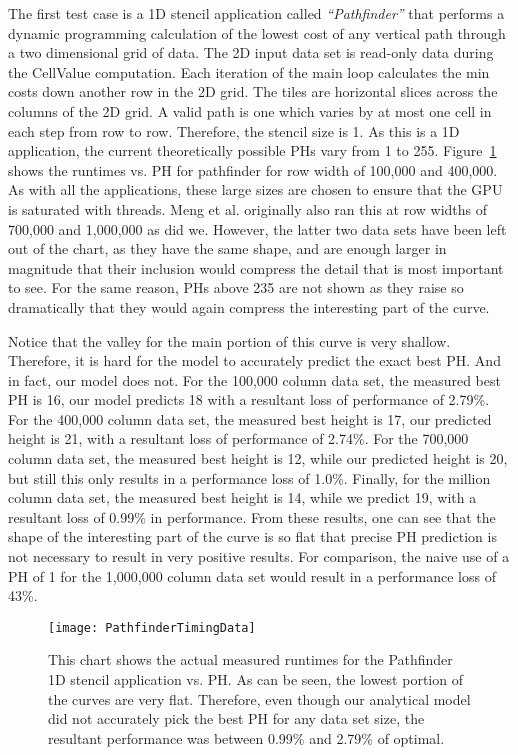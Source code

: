 \documentclass{styles/sig-alternate}
\begin{document}
The first test case is a 1D stencil application called {\em ``Pathfinder''} that performs a dynamic programming calculation 
of the lowest cost of any vertical path through a two dimensional grid of data.  
The 2D input data set is read-only data during the CellValue computation.  
Each iteration of the main loop calculates the min costs down another row in the 2D grid.
The tiles are horizontal slices across the columns of the 2D grid.  A valid path is one which varies by at most one cell 
in each step from row to row.  Therefore, the stencil size is 1.  As this is a 1D application,
the current theoretically possible PHs vary from 1 to 255.  
Figure~\ref{fig:pathfinderTimes} shows the runtimes vs. PH for pathfinder for
row width of 100,000 and 400,000.  As with all the applications, these large sizes are chosen to ensure
that the GPU is saturated with threads.  Meng et al. originally also ran this at row widths of 700,000 and 1,000,000 as did we.
However, the latter two data sets have been left out of the chart, as they have the same shape, and are enough
larger in magnitude that their inclusion would compress the detail that is most important to see.  For the same
reason, PHs above 235 are not shown as they raise so dramatically that they would again compress
the interesting part of the curve.  


Notice that the valley for the main portion of this curve is very shallow.  Therefore, it 
is hard for the model to accurately predict the exact best PH.  And in fact, our model does not.  For the 100,000 column data set,
the measured best PH is 16, our model predicts 18 with a resultant loss of performance of 2.79\%.  For the 400,000 column data set,
the measured best height is 17, our predicted height is 21, with a resultant loss of performance of 2.74\%.  For the 700,000 column data set,
the measured best height is 12, while our predicted height is 20, but still this only results in a performance loss of 1.0\%.  Finally, for the
million column data set, the measured best height is 14, while we predict 19, with a resultant loss of 0.99\% in performance.  From these results, one
can see that the shape of the interesting part of the curve is so flat that precise PH prediction is not necessary to result in very positive results.
For comparison, the naive use of a PH of 1 for the 1,000,000 column data set would result in a performance loss of 43\%.

\begin{figure}
\texttt{[image: PathfinderTimingData]}
\caption{This chart shows the actual measured runtimes for the Pathfinder 1D stencil application vs. PH.
As can be seen, the lowest portion of the curves are very flat.  Therefore, even though our analytical model did not 
accurately pick the best PH for any data set size, the resultant performance was between 0.99\% and 2.79\% of optimal.}
\label{fig:pathfinderTimes}
\end{figure}
\end{document}
